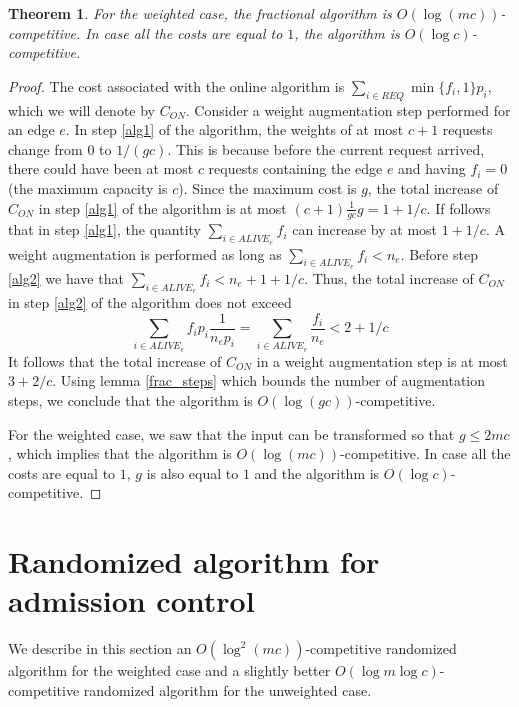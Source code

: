 \documentclass{sig-alternate}
\newtheorem{theorem}{Theorem}\newtheorem{prop}[theorem]{Proposition}
\begin{document}
\begin{theorem}\label{frac_comp}
For the weighted case, the fractional algorithm is $O(\log
(mc))$-competitive. In case all the costs are equal to $1$, the
algorithm is $O(\log c)$-competitive.
\end{theorem}

\begin{proof}
The cost associated with the online algorithm is $\sum_{i \in REQ}
\min \{f_i,1\} p_i$, which we will denote by $C_{ON}$. Consider a
weight augmentation step performed for an edge $e$. In step
\ref{alg1} of the algorithm, the weights of at most $c+1$ requests
change from $0$ to $1/(gc)$. This is because before the current
request arrived, there could have been at most $c$ requests
containing the edge $e$ and having $f_i=0$ (the maximum capacity
is $c$). Since the maximum cost is $g$, the total increase of
$C_{ON}$ in step \ref{alg1} of the algorithm is at most
$(c+1)\frac{1}{gc}g = 1+1/c$. If follows that in step \ref{alg1},
the quantity $\sum_{i \in ALIVE_e} f_i$ can increase by at most
$1+1/c$. A weight augmentation is performed as long as $\sum_{i
\in ALIVE_e} f_i < n_e$. Before step \ref{alg2} we have that
$\sum_{i \in ALIVE_e} f_i < n_e + 1+1/c$. Thus, the total increase
of $C_{ON}$ in step \ref{alg2} of the algorithm does not exceed
$$
\sum_{i \in ALIVE_e} f_i p_i \frac{1}{n_e p_i} = \sum_{i \in
ALIVE_e} \frac{f_i}{n_e} < 2+1/c
$$
It follows that the total increase of $C_{ON}$ in a weight
augmentation step is at most $3+2/c$. Using lemma \ref{frac_steps}
which bounds the number of augmentation steps, we conclude that
the algorithm is $O(\log (gc))$-competitive.

For the weighted case, we saw that the input can be transformed so
that $g \leq 2mc$, which implies that the algorithm is $O(\log
(mc))$-competitive. In case all the costs are equal to $1$, $g$ is
also equal to $1$ and the algorithm is $O(\log c)$-competitive.

\end{proof}

\section{Randomized algorithm for \\ admission control}\label{sec:rand}

We describe in this section an $O(\log^2 (mc))$-competitive
randomized algorithm for the weighted case and a slightly better
$O(\log m \log c)$-competitive randomized algorithm for the
unweighted case.
\end{document}
